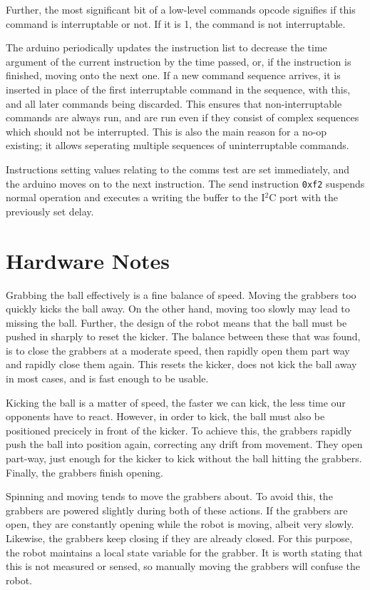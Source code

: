 \documentclass[a4paper]{scrartcl}
\begin{document}
Further, the most significant bit of a low-level commands opcode signifies if this command is interruptable or not. If it is 1, the command is not interruptable.

The arduino periodically updates the instruction list to decrease the time
argument of the current instruction by the time passed, or, if the instruction
is finished, moving onto the next one. If a new command sequence arrives, it is
inserted in place of the first interruptable command in the sequence, with
this, and all later commands being discarded. This ensures that
non-interruptable commands are always run, and are run even if they consist of
complex sequences which should not be interrupted. This is also the main reason
for a no-op existing; it allows seperating multiple sequences of
uninterruptable commands.

Instructions setting values relating to the comms test are set immediately,
and the arduino moves on to the next instruction. The send instruction
\texttt{0xf2} suspends normal operation and executes a writing the buffer to
the I$^2$C port with the previously set delay.

\section{Hardware Notes}

Grabbing the ball effectively is a fine balance of speed. Moving the grabbers
too quickly kicks the ball away. On the other hand, moving too slowly may lead
to missing the ball. Further, the design of the robot means that the ball must
be pushed in sharply to reset the kicker. The balance between these that was
found, is to close the grabbers at a moderate speed, then rapidly open them
part way and rapidly close them again. This resets the kicker, does not kick the ball away in most cases, and is fast enough to be usable.

Kicking the ball is a matter of speed, the faster we can kick, the less time
our opponents have to react. However, in order to kick, the ball must also be
positioned precicely in front of the kicker. To achieve this, the grabbers
rapidly push the ball into position again, correcting any drift from movement.
They open part-way, just enough for the kicker to kick without the ball
hitting the grabbers. Finally, the grabbers finish opening.

Spinning and moving tends to move the grabbers about. To avoid this, the
grabbers are powered slightly during both of these actions. If the grabbers are
open, they are constantly opening while the robot is moving, albeit very
slowly. Likewise, the grabbers keep closing if they are already closed. For
this purpose, the robot maintains a local state variable for the grabber. It is
worth stating that this is not measured or sensed, so manually moving the
grabbers will confuse the robot.
\end{document}
